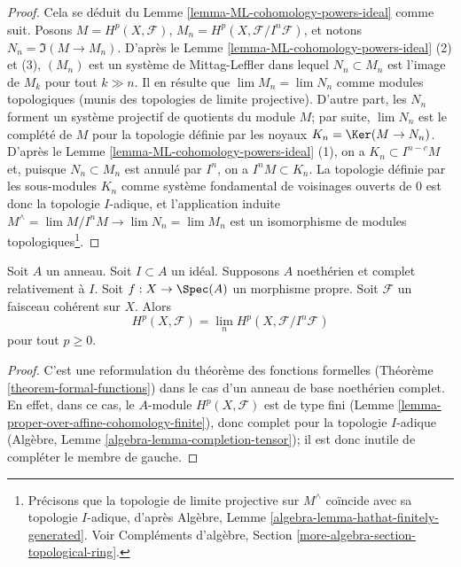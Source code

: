 \begin{proof}
Cela se déduit du Lemme \ref{lemma-ML-cohomology-powers-ideal} comme suit.
Posons $M = H^p(X, \mathcal{F})$, $M_n = H^p(X, \mathcal{F}/I^n\mathcal{F})$,
et notons $N_n = \Im(M \to M_n)$. D'après le
Lemme \ref{lemma-ML-cohomology-powers-ideal} (2) et (3),
$(M_n)$ est un système de Mittag-Leffler dans lequel
$N_n \subset M_n$ est l'image de $M_k$ pour tout $k \gg n$.
Il en résulte que $\lim M_n = \lim N_n$ comme modules topologiques (munis des
topologies de limite projective). D'autre part, les $N_n$ forment un système projectif de quotients
du module $M$; par suite, $\lim N_n$ est le complété de $M$
pour la topologie définie par les noyaux $K_n = \Ker(M \to N_n)$.
D'après le Lemme \ref{lemma-ML-cohomology-powers-ideal} (1),
on a $K_n \subset I^{n - c}M$ et, puisque $N_n \subset M_n$
est annulé par $I^n$, on a $I^n M \subset K_n$.
La topologie définie par les sous-modules $K_n$
comme système fondamental de voisinages ouverts de $0$
est donc la topologie $I$-adique, et l'application
induite $M^\wedge = \lim M/I^nM \to \lim N_n = \lim M_n$
est un isomorphisme de modules topologiques\footnote{
Précisons que la topologie de limite projective sur $M^\wedge$ coïncide avec sa
topologie $I$-adique, d'après
Algèbre, Lemme \ref{algebra-lemma-hathat-finitely-generated}.
Voir Compléments d'algèbre, Section \ref{more-algebra-section-topological-ring}.}.
\end{proof}

\begin{lemma}
\label{lemma-spell-out-theorem-formal-functions}
Soit $A$ un anneau. Soit $I \subset A$ un idéal. Supposons $A$
noethérien et complet relativement à $I$.
Soit $f : X \to \Spec(A)$ un morphisme propre.
Soit $\mathcal{F}$ un faisceau cohérent sur $X$.
Alors
$$
H^p(X, \mathcal{F}) = \lim_n H^p(X, \mathcal{F}/I^n\mathcal{F})
$$
pour tout $p \geq 0$.
\end{lemma}

\begin{proof}
C'est une reformulation du théorème des fonctions formelles
(Théorème \ref{theorem-formal-functions}) dans le
cas d'un anneau de base noethérien complet. En effet, dans ce cas,
le $A$-module $H^p(X, \mathcal{F})$ est de type fini
(Lemme \ref{lemma-proper-over-affine-cohomology-finite}), donc
complet pour la topologie $I$-adique (Algèbre, Lemme \ref{algebra-lemma-completion-tensor});
il est donc inutile de compléter le membre de gauche.
\end{proof}

